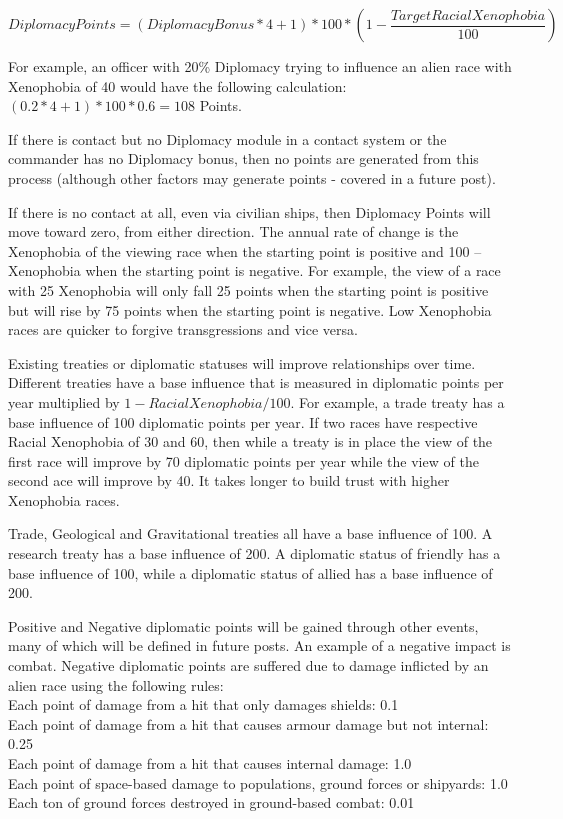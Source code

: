 \documentclass[../../Aurora C# unofficial manual.tex]{subfiles}
\begin{document}
	\[ Diplomacy Points = (Diplomacy Bonus * 4 + 1) * 100 * (1 - \frac{Target Racial Xenophobia}{100}) \]
	
	For example, an officer with 20\% Diplomacy trying to influence an alien race with Xenophobia of 40 would have the following calculation: \( (0.2 * 4 + 1) * 100 * 0.6 = 108 \) Points.
	
	If there is contact but no Diplomacy module in a contact system or the commander has no Diplomacy bonus, then no points are generated from this process (although other factors may generate points - covered in a future post).
	
	If there is no contact at all, even via civilian ships, then Diplomacy Points will move toward zero, from either direction. The annual rate of change is the Xenophobia of the viewing race when the starting point is positive and 100 – Xenophobia when the starting point is negative. For example, the view of a race with 25 Xenophobia will only fall 25 points when the starting point is positive but will rise by 75 points when the starting point is negative. Low Xenophobia races are quicker to forgive transgressions and vice versa.
	
	Existing treaties or diplomatic statuses will improve relationships over time. Different treaties have a base influence that is measured in diplomatic points per year multiplied by \( 1 - Racial Xenophobia / 100 \). For example, a trade treaty has a base influence of 100 diplomatic points per year. If two races have respective Racial Xenophobia of 30 and 60, then while a treaty is in place the view of the first race will improve by 70 diplomatic points per year while the view of the second ace will improve by 40. It takes longer to build trust with higher Xenophobia races.
	
	Trade, Geological and Gravitational treaties all have a base influence of 100. A research treaty has a base influence of 200. A diplomatic status of friendly has a base influence of 100, while a diplomatic status of allied has a base influence of 200.
	
	Positive and Negative diplomatic points will be gained through other events, many of which will be defined in future posts. An example of a negative impact is combat. Negative diplomatic points are suffered due to damage inflicted by an alien race using the following rules:\\
	Each point of damage from a hit that only damages shields: 0.1\\
	Each point of damage from a hit that causes armour damage but not internal: 0.25\\
	Each point of damage from a hit that causes internal damage: 1.0\\
	Each point of space-based damage to populations, ground forces or shipyards: 1.0\\
	Each ton of ground forces destroyed in ground-based combat: 0.01\\
	
\end{document}

